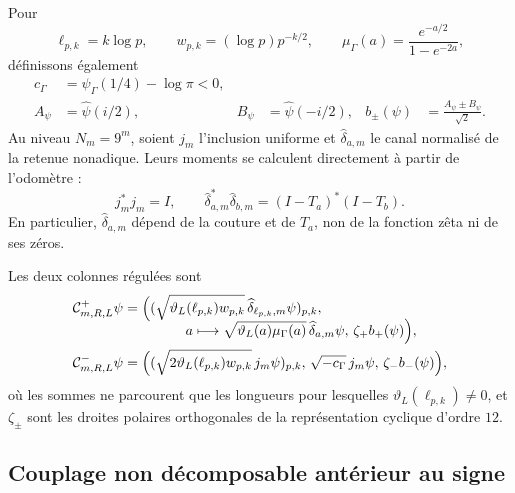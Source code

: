 Pour
\[
 \ell_{p,k}=k\log p,\qquad
 w_{p,k}=(\log p)p^{-k/2},\qquad
 \mu_\Gamma(a)=\frac{e^{-a/2}}{1-e^{-2a}},
\]
définissons également
\begin{align*}
 c_\Gamma&=\psi_\Gamma(1/4)-\log\pi<0,\\
 A_\psi&=\widehat\psi(i/2),&
 B_\psi&=\widehat\psi(-i/2),&
 b_\pm(\psi)&=\frac{A_\psi\pm B_\psi}{\sqrt2}.
\end{align*}
Au niveau \(N_m=9^m\), soient \(j_m\) l'inclusion uniforme et \(\widehat\delta_{a,m}\) le canal normalisé de la retenue nonadique. Leurs moments se calculent directement à partir de l'odomètre :
\begin{equation}\label{eq:amp-rh-momentos-odometro-explicitos}
 j_m^*j_m=I,\qquad
 \widehat\delta_{a,m}^*\widehat\delta_{b,m}
 =(I-T_a)^*(I-T_b).
\end{equation}
En particulier, \(\widehat\delta_{a,m}\) dépend de la couture et de \(T_a\), non de la fonction zêta ni de ses zéros.

Les deux colonnes régulées sont
\begin{align}
 \mathcal C^+_{m,R,L}\psi
 ={}&
 \Bigl(
  (\sqrt{\vartheta_L(\ell_{p,k})w_{p,k}}\,
       \widehat\delta_{\ell_{p,k},m}\psi)_{p,k},
 \nonumber\\[-2mm]
 &\hspace{11mm}
  a\longmapsto
  \sqrt{\vartheta_L(a)\mu_\Gamma(a)}\,
       \widehat\delta_{a,m}\psi,\,
  \zeta_+b_+(\psi)
 \Bigr),                                             \label{eq:amp-rh-columna-mas-explicita}\\
 \mathcal C^-_{m,R,L}\psi
 ={}&
 \Bigl(
  (\sqrt{2\vartheta_L(\ell_{p,k})w_{p,k}}\,j_m\psi)_{p,k},\,
  \sqrt{-c_\Gamma}\,j_m\psi,\,
  \zeta_-b_-(\psi)
 \Bigr),                                             \label{eq:amp-rh-columna-menos-explicita}
\end{align}
où les sommes ne parcourent que les longueurs pour lesquelles \(\vartheta_L(\ell_{p,k})\neq0\), et \(\zeta_\pm\) sont les droites polaires orthogonales de la représentation cyclique d'ordre \(12\).

\subsection*{Couplage non décomposable antérieur au signe}


